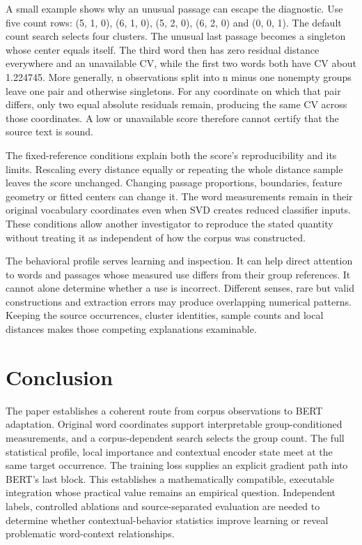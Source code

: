 \documentclass[10pt,letterpaper]{article}
\begin{document}
A small example shows why an unusual passage can escape the diagnostic. Use five count rows: (5, 1, 0), (6, 1, 0), (5, 2, 0), (6, 2, 0) and (0, 0, 1). The default count search selects four clusters. The unusual last passage becomes a singleton whose center equals itself. The third word then has zero residual distance everywhere and an unavailable CV, while the first two words both have CV about 1.224745. More generally, n observations split into n minus one nonempty groups leave one pair and otherwise singletons. For any coordinate on which that pair differs, only two equal absolute residuals remain, producing the same CV across those coordinates. A low or unavailable score therefore cannot certify that the source text is sound.\par

The fixed-reference conditions explain both the score's reproducibility and its limits. Rescaling every distance equally or repeating the whole distance sample leaves the score unchanged. Changing passage proportions, boundaries, feature geometry or fitted centers can change it. The word measurements remain in their original vocabulary coordinates even when SVD creates reduced classifier inputs. These conditions allow another investigator to reproduce the stated quantity without treating it as independent of how the corpus was constructed.\par

The behavioral profile serves learning and inspection. It can help direct attention to words and passages whose measured use differs from their group references. It cannot alone determine whether a use is incorrect. Different senses, rare but valid constructions and extraction errors may produce overlapping numerical patterns. Keeping the source occurrences, cluster identities, sample counts and local distances makes those competing explanations examinable.\par

\section{Conclusion}
The paper establishes a coherent route from corpus observations to BERT adaptation. Original word coordinates support interpretable group-conditioned measurements, and a corpus-dependent search selects the group count. The full statistical profile, local importance and contextual encoder state meet at the same target occurrence. The training loss supplies an explicit gradient path into BERT's last block. This establishes a mathematically compatible, executable integration whose practical value remains an empirical question. Independent labels, controlled ablations and source-separated evaluation are needed to determine whether contextual-behavior statistics improve learning or reveal problematic word-context relationships.\par
\end{document}
